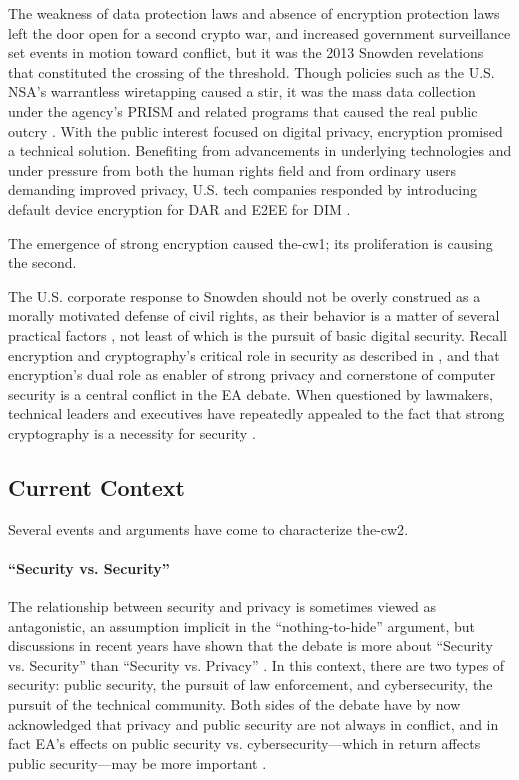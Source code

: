 The weakness of data protection laws and absence of encryption protection laws left the door open for a second crypto
war, and increased government surveillance set events in motion toward conflict, but it was the 2013 Snowden revelations
that constituted the crossing of the threshold. Though policies such as the U.S. \ac{NSA}'s warrantless wiretapping
caused a stir, it was the mass data collection under the agency's \ac{PRISM} and related programs that caused the real
public outcry \cite{landau_making_2013}. With the public interest focused on digital privacy, encryption promised a
technical solution. Benefiting from advancements in underlying technologies and under pressure from both the human
rights field and from ordinary users demanding improved privacy, U.S. tech companies responded by introducing default
device encryption for \acl{DAR} and \acl{E2EE} for \acl{DIM} \cite{treguer_us_2018}.

The emergence of strong encryption caused \ac{the-cw1}; its proliferation is causing the second.

The U.S. corporate response to Snowden should not be overly construed as a morally motivated defense of civil rights, as
their behavior is a matter of several practical factors \cite{treguer_us_2018}, not least of which is the pursuit of
basic digital security. Recall encryption and cryptography's critical role in security as described in
, and that encryption's dual role as enabler of strong privacy and cornerstone of computer
security is a central conflict in the \ac{EA} debate. When questioned by lawmakers, technical leaders and executives
have repeatedly appealed to the fact that strong cryptography is a necessity for security \cite{schulze_clipper_2017}.

\subsection{Current Context}
\label{sec-history-current}

Several events and arguments have come to characterize \ac{the-cw2}.

\paragraph*{``Security vs. Security''} The relationship between security and privacy is sometimes viewed as
antagonistic, an assumption implicit in the ``nothing-to-hide'' argument, but discussions in recent years have shown
that the debate is more about ``Security vs. Security'' than ``Security vs. Privacy''
\cite{stalla_bourdillon_privacy_2014}. In this context, there are two types of security: public security, the pursuit of
law enforcement, and cybersecurity, the pursuit of the technical community. Both sides of the debate have by now
acknowledged that privacy and public security are not always in conflict, and in fact \ac{EA}'s effects on public
security vs. cybersecurity---which in return affects public security---may be more important \cite{schneier_2019}.

